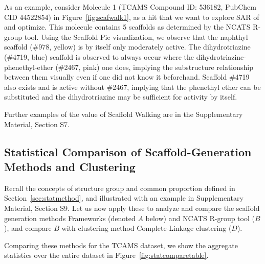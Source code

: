\documentclass[journal=jacsat,biochem,manuscript=article]{achemso}
\newcommand*\fref[1]{Figure~\ref{fig:#1}}
\newcommand*\sref[1]{Section~\ref{sec:#1}}
\begin{document}
As an example, consider Molecule 1 (TCAMS Compound ID: 536182, PubChem CID 44522854) in \fref{scafwalk1}, as a hit that we want to explore SAR of and optimize. This molecule contains 5 scaffolds as determined by the NCATS R-group tool. Using the Scaffold Pie visualization, we observe that the naphthyl scaffold (\#978, yellow) is by itself only moderately active.  The dihydrotriazine (\#4719, blue) scaffold is observed to always occur where the dihydrotriazine-phenethyl-ether (\#2467, pink) one does, implying the substructure relationship between them visually even if one did not know it beforehand. Scaffold \#4719 also exists and is active without \#2467, implying that the phenethyl ether can be substituted and the dihydrotriazine may be sufficient for activity by itself.

Further examples of the value of Scaffold Walking are in the Supplementary Material, Section S7.

\subsection{Statistical Comparison of Scaffold-Generation Methods and Clustering}\label{sec:statcomp}

Recall the concepts of structure group and common proportion defined in \sref{statmethod}, and illustrated with an example in Supplementary Material, Section S9.  Let us now apply these to analyze and compare the scaffold generation methods Frameworks (denoted $A$ below) and NCATS R-group tool ($B$), and compare $B$ with clustering method Complete-Linkage clustering ($D$).

Comparing these methods for the TCAMS dataset, we show the aggregate statistics over the entire dataset in \fref{statcomparetable}.  
\end{document}
